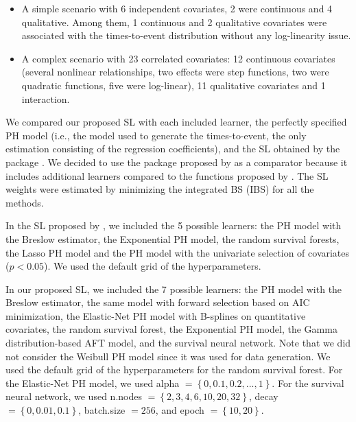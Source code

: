 \begin{itemize}
\item
  A simple scenario with 6 independent covariates, 2 were continuous and 4 qualitative. Among them, 1 continuous and 2 qualitative covariates were associated with the times-to-event distribution without any log-linearity issue.
\item
  A complex scenario with 23 correlated covariates: 12 continuous covariates (several nonlinear relationships, two effects were step functions, two were quadratic functions, five were log-linear), 11 qualitative covariates and 1 interaction.
\end{itemize}

We compared our proposed SL with each included learner, the perfectly specified PH model (i.e., the model used to generate the times-to-event, the only estimation consisting of the regression coefficients), and the SL obtained by the  package \citep{westlingPkgsurvSuperLearnerSuperLearning2021}. We decided to use the package proposed by \citet{westlingPkgsurvSuperLearnerSuperLearning2021} as a comparator because it includes additional learners compared to the functions proposed by \citet{golmakaniSuperLearnerSurvival2020a}. The SL weights were estimated by minimizing the integrated BS (IBS) for all the methods.

In the SL proposed by \citet{westlingPkgsurvSuperLearnerSuperLearning2021}, we included the 5 possible learners: the PH model with the Breslow estimator, the Exponential PH model, the random survival forests, the Lasso PH model and the PH model with the univariate selection of covariates (\(p<0.05\)). We used the default grid of the hyperparameters.

In our proposed SL, we included the 7 possible learners: the PH model with the Breslow estimator, the same model with forward selection based on AIC minimization, the Elastic-Net PH model with B-splines on quantitative covariates, the random survival forest, the Exponential PH model, the Gamma distribution-based AFT model, and the survival neural network. Note that we did not consider the Weibull PH model since it was used for data generation. We used the default grid of the hyperparameters for the random survival forest. For the Elastic-Net PH model, we used \textsf{alpha} \(= \left \lbrace 0, 0.1, 0.2, ..., 1 \right \rbrace\). For the survival neural network, we used \textsf{n.nodes} \(= \left \lbrace 2, 3, 4, 6, 10, 20, 32 \right \rbrace\), \textsf{decay} \(= \left \lbrace 0, 0.01, 0.1 \right \rbrace\), \textsf{batch.size} \(= 256\), and \textsf{epoch} \(= \left\lbrace 10, 20 \right\rbrace\).

